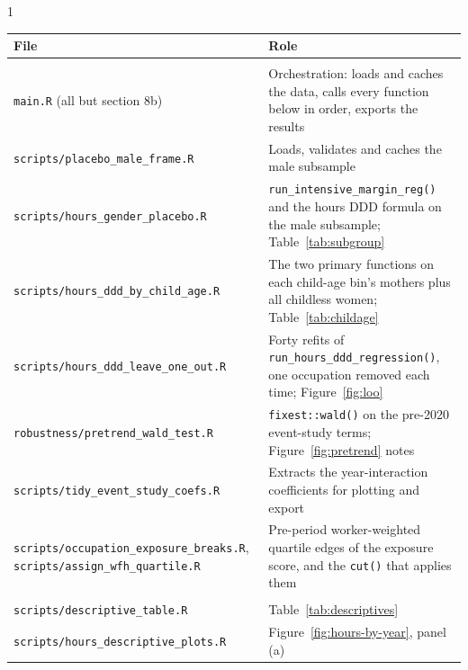 \begin{spacing}{1}
\begin{center}
\begin{minipage}{\textwidth}
\label{tab:code-index}
\renewcommand{\baselinestretch}{1}\scriptsize\setlength{\tabcolsep}{4pt}
\begin{tabular}{@{}>{\raggedright\arraybackslash}p{}>{\raggedright\arraybackslash}p{}@{}}
\toprule
File & Role \\
\midrule
\multicolumn{2}{@{}l}{\emph{Pipeline and wrappers}} \\
\texttt{main.R} (all but section 8b) & Orchestration: loads and caches the data, calls every function below in order, exports the results \\
\texttt{scripts/placebo\_male\_frame.R} & Loads, validates and caches the male subsample \\
\texttt{scripts/hours\_gender\_placebo.R} & \texttt{run\_intensive\_margin\_reg()} and the hours DDD formula on the male subsample; Table~\ref{tab:subgroup} \\
\texttt{scripts/hours\_ddd\_by\_child\_age.R} & The two primary functions on each child-age bin's mothers plus all childless women; Table~\ref{tab:childage} \\
\texttt{scripts/hours\_ddd\_leave\_one\_out.R} & Forty refits of \texttt{run\_hours\_ddd\_regression()}, one occupation removed each time; Figure~\ref{fig:loo} \\
\texttt{robustness/pretrend\_wald\_test.R} & \texttt{fixest::wald()} on the pre-2020 event-study terms; Figure~\ref{fig:pretrend} notes \\
\texttt{scripts/tidy\_event\_study\_coefs.R} & Extracts the year-interaction coefficients for plotting and export \\
\texttt{scripts/occupation\_exposure\_breaks.R}, \texttt{scripts/assign\_wfh\_quartile.R} & Pre-period worker-weighted quartile edges of the exposure score, and the \texttt{cut()} that applies them \\
\multicolumn{2}{@{}l}{\emph{Descriptive figures and tables}} \\
\texttt{scripts/descriptive\_table.R} & Table~\ref{tab:descriptives} \\
\texttt{scripts/hours\_descriptive\_plots.R} & Figure~\ref{fig:hours-by-year}, panel (a) \\

\end{tabular}
\end{minipage}
\end{center}
\end{spacing}
